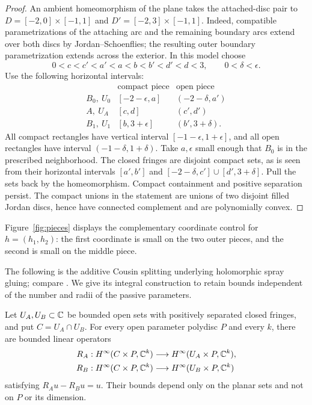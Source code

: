 \begin{proof}
An ambient homeomorphism of the plane takes the attached-disc pair
to $D=[-2,0]\times[-1,1]$ and $D'=[-2,3]\times[-1,1]$.
Indeed, compatible parametrizations of the attaching arc and the
remaining boundary arcs extend over both discs by
Jordan--Schoenflies; the resulting outer boundary parametrization
extends across the exterior.
In this model choose
\[
0<c<c'<a'<a<b<b'<d'<d<3,\qquad 0<\delta<\epsilon.
\]
Use the following horizontal intervals:
\[
\begin{array}{c|c|c}
&\text{compact piece}&\text{open piece}\\ \hline
B_0,\ U_0&[-2-\epsilon,a]&(-2-\delta,a')\\
A,\ U_A&[c,d]&(c',d')\\
B_1,\ U_1&[b,3+\epsilon]&(b',3+\delta).
\end{array}
\]
All compact rectangles have vertical interval
$[-1-\epsilon,1+\epsilon]$, and all open rectangles have interval
$(-1-\delta,1+\delta)$. Take $a,\epsilon$ small enough that $B_0$
is in the prescribed neighborhood. The closed fringes are disjoint
compact sets, as is seen from their horizontal intervals
$[a',b']$ and $[-2-\delta,c']\cup[d',3+\delta]$.
Pull the sets back by the homeomorphism. Compact containment and
positive separation persist. The compact unions in the statement
are unions of two disjoint filled Jordan discs, hence have connected
complement and are polynomially convex.
\end{proof}

Figure~\ref{fig:pieces} displays the complementary coordinate control
for $h=(h_1,h_2)$: the first coordinate is small on the two outer pieces,
and the second is small on the middle piece.


The following is the additive Cousin splitting underlying holomorphic
spray gluing; compare \cite[Lemma~4.6]{ForstnericSplitting}.
We give its integral construction to retain bounds independent of the
number and radii of the passive parameters.

\begin{lemma}\label{loc:splitting}
Let $U_A,U_B\subset\mathbb C$ be bounded open sets with positively separated
closed fringes, and put $C=U_A\cap U_B$. For every open parameter
polydisc $P$ and every $k$, there are bounded linear operators
\[
\begin{aligned}
R_A&:H^\infty(C\times P,\mathbb C^k)\longrightarrow
H^\infty(U_A\times P,\mathbb C^k),\\
R_B&:H^\infty(C\times P,\mathbb C^k)\longrightarrow
H^\infty(U_B\times P,\mathbb C^k)
\end{aligned}
\]
satisfying $R_Au-R_Bu=u$. Their bounds depend only on the planar
sets and not on $P$ or its dimension.
\end{lemma}


